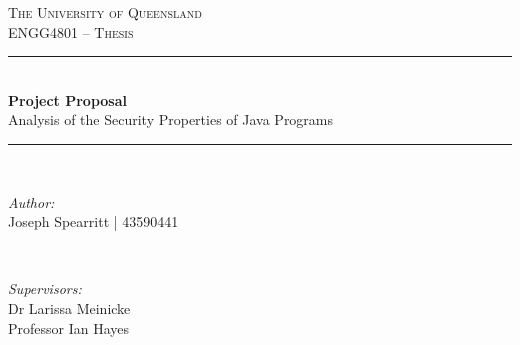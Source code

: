 
\begin{titlepage}

\newcommand{\HRule}{\rule{\linewidth}{0.5mm}} %

\centering %
 

\textsc{\LARGE The University of Queensland}\\[1cm] %
\textsc{\Large ENGG4801 -- Thesis}\\[0.5cm] %


\HRule \\[0.4cm]
{ \huge \bfseries Project Proposal}\\[0.2cm]
{\huge Analysis of the Security Properties of Java Programs}
\HRule \\[.5cm]
 

\begin{minipage}{0.45\textwidth}
\begin{flushleft} \large
\emph{Author:}\\
Joseph Spearritt | 43590441
\end{flushleft}
\end{minipage}
~
\begin{minipage}{0.45\textwidth}
\begin{flushright} \large
\emph{Supervisors:}\\
Dr Larissa Meinicke\\
Professor Ian Hayes
\end{flushright}
\end{minipage}\\[1.5cm]


\end{titlepage}
